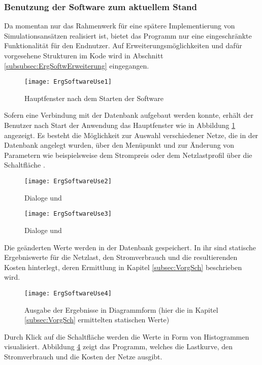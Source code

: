 \subsubsection{Benutzung der Software zum aktuellem Stand}
Da momentan nur das Rahmenwerk für eine spätere Implementierung von Simulationsansätzen realisiert ist, bietet das Programm nur eine eingeschränkte Funktionalität für den Endnutzer. Auf Erweiterungsmöglichkeiten und dafür vorgesehene Strukturen im Kode wird in Abschnitt \ref{subsubsec:ErgSoftwErweiterung} eingegangen.
\begin{figure}[ht]
	\centering
	\texttt{[image: ErgSoftwareUse1]}
	\caption{Hauptfenster nach dem Starten der Software}
	\label{fig:ErgSoftwareUse1}
\end{figure}
Sofern eine Verbindung mit der Datenbank aufgebaut werden konnte, erhält der Benutzer nach Start der Anwendung das Hauptfenster wie in Abbildung \ref{fig:ErgSoftwareUse1} angezeigt. Es besteht die Möglichkeit zur Auswahl verschiedener Netze, die in der Datenbank angelegt wurden, über den Menüpunkt  und zur Änderung von Parametern wie beispielsweise dem Strompreis oder dem Netzlastprofil über die Schaltfläche .
\begin{figure}[ht]
	\centering
	\texttt{[image: ErgSoftwareUse2]}
	\caption{Dialoge  und }
	\label{fig:ErgSoftwareUse2}
\end{figure}
\begin{figure}[ht]
	\centering
	\texttt{[image: ErgSoftwareUse3]}
	\caption{Dialoge  und }
	\label{fig:ErgSoftwareUse3}
\end{figure}
Die geänderten Werte werden in der Datenbank gespeichert. In ihr sind statische Ergebniswerte für die Netzlast, den Stromverbrauch und die resultierenden Kosten hinterlegt, deren Ermittlung in Kapitel \ref{subsec:VorgSch} beschrieben wird.
\begin{figure}[ht]
	\centering
	\texttt{[image: ErgSoftwareUse4]}
	\caption{Ausgabe der Ergebnisse in Diagrammform (hier die in Kapitel \ref{subsec:VorgSch} ermittelten statischen Werte)}
	\label{fig:ErgSoftwareUse4}
\end{figure}
Durch Klick auf die Schaltfläche  werden die Werte in Form von Histogrammen visualisiert. Abbildung \ref{fig:ErgSoftwareUse4} zeigt das Programm, welches die Lastkurve, den Stromverbrauch und die Kosten der Netze ausgibt.


